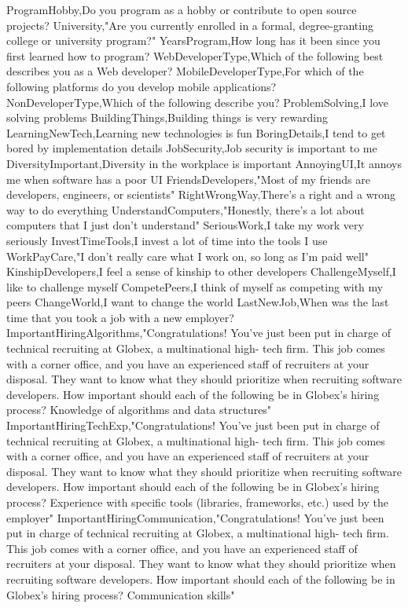 \begin{appendices}
ProgramHobby,Do you program as a hobby or contribute to open source projects?
University,"Are you currently enrolled in a formal, degree-granting college or university program?"
YearsProgram,How long has it been since you first learned how to program?
WebDeveloperType,Which of the following best describes you as a Web developer?
MobileDeveloperType,For which of the following platforms do you develop mobile applications?
NonDeveloperType,Which of the following describe you?
ProblemSolving,I love solving problems
BuildingThings,Building things is very rewarding
LearningNewTech,Learning new technologies is fun
BoringDetails,I tend to get bored by implementation details
JobSecurity,Job security is important to me
DiversityImportant,Diversity in the workplace is important
AnnoyingUI,It annoys me when software has a poor UI
FriendsDevelopers,"Most of my friends are developers, engineers, or scientists"
RightWrongWay,There's a right and a wrong way to do everything
UnderstandComputers,"Honestly, there's a lot about computers that I just don't understand"
SeriousWork,I take my work very seriously
InvestTimeTools,I invest a lot of time into the tools I use
WorkPayCare,"I don't really care what I work on, so long as I'm paid well"
KinshipDevelopers,I feel a sense of kinship to other developers
ChallengeMyself,I like to challenge myself
CompetePeers,I think of myself as competing with my peers
ChangeWorld,I want to change the world
LastNewJob,When was the last time that you took a job with a new employer?
ImportantHiringAlgorithms,"Congratulations! You've just been put in charge of technical recruiting at Globex, a multinational high- tech firm. This job comes with a corner office, and you have an experienced staff of recruiters at your disposal. They want to know what they should prioritize when recruiting software developers. How important should each of the following be in Globex's hiring process? Knowledge of algorithms and data structures"
ImportantHiringTechExp,"Congratulations! You've just been put in charge of technical recruiting at Globex, a multinational high- tech firm. This job comes with a corner office, and you have an experienced staff of recruiters at your disposal. They want to know what they should prioritize when recruiting software developers. How important should each of the following be in Globex's hiring process? Experience with specific tools (libraries, frameworks, etc.) used by the employer"
ImportantHiringCommunication,"Congratulations! You've just been put in charge of technical recruiting at Globex, a multinational high- tech firm. This job comes with a corner office, and you have an experienced staff of recruiters at your disposal. They want to know what they should prioritize when recruiting software developers. How important should each of the following be in Globex's hiring process? Communication skills"

\end{appendices}
